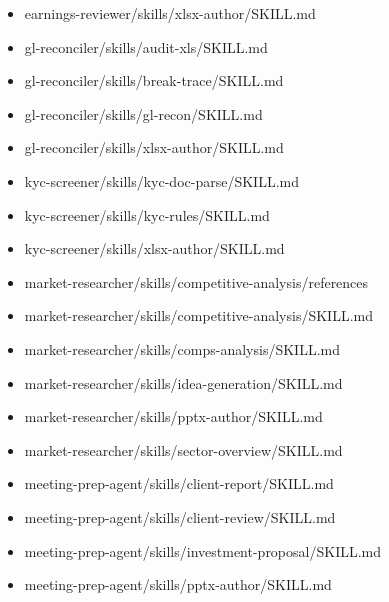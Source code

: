 \documentclass[11pt]{article}
\begin{document}
\begin{itemize}[leftmargin=*,itemsep=1pt,topsep=2pt]
\item \hspace*{2.7em}earnings-reviewer/skills/xlsx-author/SKILL.md
\item \hspace*{2.7em}gl-reconciler/skills/audit-xls/SKILL.md
\item \hspace*{2.7em}gl-reconciler/skills/break-trace/SKILL.md
\item \hspace*{2.7em}gl-reconciler/skills/gl-recon/SKILL.md
\item \hspace*{2.7em}gl-reconciler/skills/xlsx-author/SKILL.md
\item \hspace*{2.7em}kyc-screener/skills/kyc-doc-parse/SKILL.md
\item \hspace*{2.7em}kyc-screener/skills/kyc-rules/SKILL.md
\item \hspace*{2.7em}kyc-screener/skills/xlsx-author/SKILL.md
\item \hspace*{2.7em}market-researcher/skills/competitive-analysis/references
\item \hspace*{2.7em}market-researcher/skills/competitive-analysis/SKILL.md
\item \hspace*{2.7em}market-researcher/skills/comps-analysis/SKILL.md
\item \hspace*{2.7em}market-researcher/skills/idea-generation/SKILL.md
\item \hspace*{2.7em}market-researcher/skills/pptx-author/SKILL.md
\item \hspace*{2.7em}market-researcher/skills/sector-overview/SKILL.md
\item \hspace*{2.7em}meeting-prep-agent/skills/client-report/SKILL.md
\item \hspace*{2.7em}meeting-prep-agent/skills/client-review/SKILL.md
\item \hspace*{2.7em}meeting-prep-agent/skills/investment-proposal/SKILL.md
\item \hspace*{2.7em}meeting-prep-agent/skills/pptx-author/SKILL.md

\end{itemize}
\end{document}
